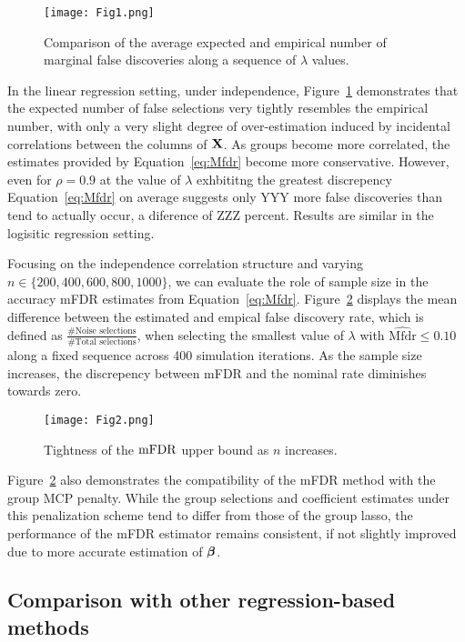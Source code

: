 \begin{figure} [!htb]
 \centering
  \texttt{[image: Fig1.png]}
  \caption{\label{Fig:lseq} Comparison of the average expected and empirical number of marginal false discoveries along a sequence of $\lambda$ values.}
\end{figure}


In the linear regression setting, under independence, Figure~\ref{Fig:lseq} demonstrates that the expected number of false selections very tightly resembles the empirical number, with only a very slight degree of over-estimation induced by incidental correlations between the columns of $\mathbf{X}$.  As groups become more correlated, the estimates provided by  Equation~\ref{eq:Mfdr} become more conservative.  However, even for $\rho = 0.9$ at the value of $\lambda$ exhbititng the greatest discrepency Equation~\ref{eq:Mfdr} on average suggests only YYY more false discoveries than tend to actually occur, a diference of ZZZ percent.  Results are similar in the logisitic regression setting.  

Focusing on the independence correlation structure and varying $n \in \{200, 400, 600, 800, 1000\}$, we can evaluate the role of sample size in the accuracy mFDR estimates from Equation~\ref{eq:Mfdr}.  Figure~\ref{Fig:conv} displays the mean difference between the estimated and empical false discovery rate, which is defined as $\tfrac{\# \text{Noise selections}}{\# \text{Total selections}}$, when selecting the smallest value of $\lambda$ with $\widehat{\text{Mfdr}} \leq 0.10$ along a fixed sequence across 400 simulation iterations.  As the sample size increases, the discrepency between mFDR and the nominal rate diminishes towards zero.

\begin{figure} [!htb]
 \centering
  \texttt{[image: Fig2.png]}
  \caption{\label{Fig:conv} Tightness of the $\textrm{mFDR}$ upper bound as $n$ increases.}
\end{figure}


Figure~\ref{Fig:conv} also demonstrates the compatibility of the mFDR method with the group MCP penalty.  While the group selections and coefficient estimates under this penalization scheme tend to differ from those of the group lasso, the performance of the mFDR estimator remains consistent, if not slightly improved due to more accurate estimation of $\boldsymbol{\beta}$.

\subsection{Comparison with other regression-based methods}

